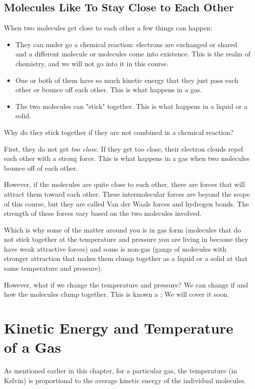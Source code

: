 \subsection{Molecules Like To Stay Close to Each Other}

When two molecules get close to each other a few things can happen:
\begin{itemize} 
\item They can under go a chemical reaction: electrons are exchanged or shared and a different molecule or molecules come into existence. 
This is the realm of chemistry, and we will not go into it in this course.
\item One or both of them have so much kinetic energy that they just pass each other or bounce off each other. This is what happens in a gas.
\item The two molecules can "stick" together. This is what happens in a liquid or a solid.
\end{itemize}

Why do they stick together if they are not combined in a chemical reaction?

First, they do not get \emph{too close}. If they get too close, their electron clouds repel each other with a strong force. 
This is what happens in a gas when two molecules bounce off of each other.

However, if the molecules are quite close to each other, there are forces that will attract them toward each other. 
These intermolecular forces are beyond the scope of this course, but they are called Van der Waals forces and hydrogen bonds.  
The strength of these forces vary based on the two molecules involved. 

Which is why some of the matter around you is in gas form (molecules that do not stick together at the temperature and pressure you are living in because they have weak attractive forces) and some is non-gas 
(gangs of molecules with stronger attraction that makes them clump together as a liquid or a solid at that same temperature and pressure).

However, what if we change the temperature and pressure? We can change if and how the molecules clump together. 
This is known a ; We will cover it soon.


\section{Kinetic Energy and Temperature of a Gas}
As mentioned earlier in this chapter, for a particular gas, the temperature (in Kelvin) is proportional to the average kinetic energy of the individual molecules. 

